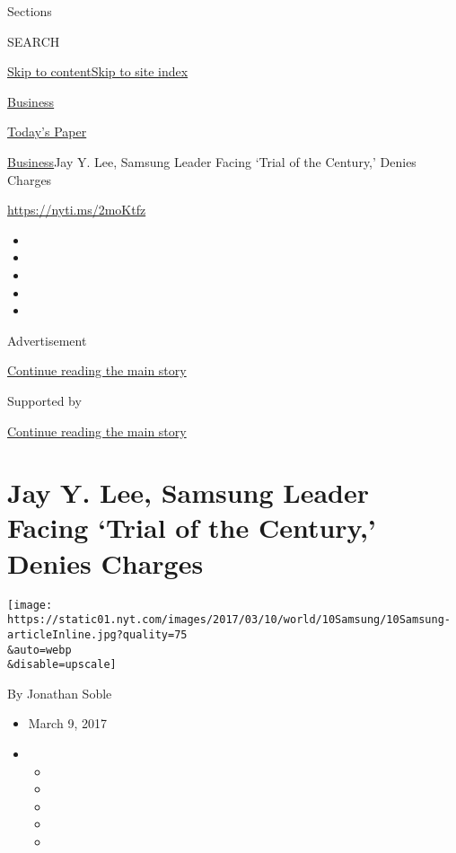 Sections

SEARCH

\protect\hyperlink{site-content}{Skip to
content}\protect\hyperlink{site-index}{Skip to site index}

\href{https://www.nytimes.com/section/business}{Business}

\href{https://myaccount.nytimes.com/auth/login?response_type=cookie\&client_id=vi}{}

\href{https://www.nytimes.com/section/todayspaper}{Today's Paper}

\href{/section/business}{Business}\textbar{}Jay Y. Lee, Samsung Leader
Facing `Trial of the Century,' Denies Charges

\url{https://nyti.ms/2moKtfz}

\begin{itemize}
\item
\item
\item
\item
\item
\end{itemize}

Advertisement

\protect\hyperlink{after-top}{Continue reading the main story}

Supported by

\protect\hyperlink{after-sponsor}{Continue reading the main story}

\hypertarget{jay-y-lee-samsung-leader-facing-trial-of-the-century-denies-charges}{%
\section{Jay Y. Lee, Samsung Leader Facing `Trial of the Century,'
Denies
Charges}\label{jay-y-lee-samsung-leader-facing-trial-of-the-century-denies-charges}}

\texttt{[image: https://static01.nyt.com/images/2017/03/10/world/10Samsung/10Samsung-articleInline.jpg?quality=75\\\&auto=webp\\\&disable=upscale]}

By Jonathan Soble

\begin{itemize}
\item
  March 9, 2017
\item
  \begin{itemize}
  \item
  \item
  \item
  \item
  \item
  \end{itemize}
\end{itemize}

